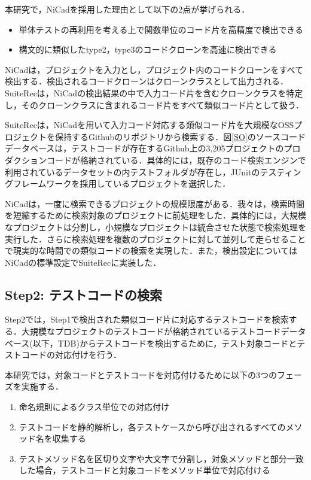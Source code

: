 \documentclass[12pt]{jarticle} %
\begin{document}
本研究で，{\sf NiCad}を採用した理由として以下の2点が挙げられる．

\begin{itemize}
\item 単体テストの再利用を考える上で関数単位のコード片を高精度で検出できる
\item 構文的に類似したtype2，type3のコードクローンを高速に検出できる
\end{itemize}


{\sf NiCad}は，プロジェクトを入力とし，プロジェクト内のコードクローンをすべて検出する．検出されるコードクローンはクローンクラスとして出力される．{\sf SuiteRec}は，{\sf NiCad}の検出結果の中で入力コード片を含むクローンクラスを特定し，そのクローンクラスに含まれるコード片をすべて類似コード片として扱う．

{\sf SuiteRec}は，{\sf NiCad}を用いて入力コード対応する類似コード片を大規模なOSSプロジェクトを保持するGithubのリポジトリから検索する．図\ref{SO}のソースコードデータベースは，テストコードが存在するGithub上の3,205プロジェクトのプロダクションコードが格納されている．具体的には，既存のコード検索エンジンで利用されているデータセット\cite{FaCoY}の内テストフォルダが存在し，JUnitのテスティングフレームワークを採用しているプロジェクトを選択した．

{\sf NiCad}は，一度に検索できるプロジェクトの規模限度がある．我々は，検索時間を短縮するために検索対象のプロジェクトに前処理をした．具体的には，大規模なプロジェクトは分割し，小規模なプロジェクトは統合させた状態で検索処理を実行した．さらに検索処理を複数のプロジェクトに対して並列して走らせることで現実的な時間での類似コードの検索を実現した．また，検出設定については{\sf NiCad}の標準設定で{\sf SuiteRec}に実装した．

\subsection{Step2: テストコードの検索}
Step2では，Step1で検出された類似コード片に対応するテストコードを検索する．大規模なプロジェクトのテストコードが格納されているテストコードデータベース(以下，TDB)からテストコードを検出するために，テスト対象コードとテストコードの対応付けを行う．

本研究では，対象コードとテストコードを対応付けるために以下の3つのフェーズを実施する．

\begin{enumerate}
  \item 命名規則によるクラス単位での対応付け
  \item テストコードを静的解析し，各テストケースから呼び出されるすべてのメソッド名を収集する
  \item テストメソッド名を区切り文字や大文字で分割し，対象メソッドと部分一致した場合，テストコードと対象コードをメソッド単位で対応付ける
\end{enumerate}
\end{document}

